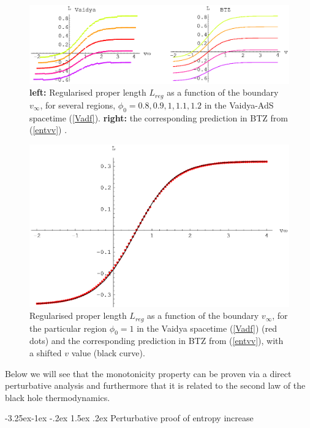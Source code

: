 \documentclass[12pt]{article}
\makeatletter
\renewcommand\subsection{\@startsection{subsection}{2}{\z@}%
                                     {-3.25ex\@plus -1ex \@minus -.2ex}%
                                     {1.5ex \@plus .2ex}%
                                     {\normalfont\bfseries}}
\def\pho{\phi_0}
\makeatother
\begin{document}
\begin{figure}[htbp]
\begin{center}
\includegraphics[width=6.5in]{Lvar_Vad}
\caption{{\bf left:} Regularised proper length $L_{reg}$ as a function of
the boundary $v_{\infty}$, for several regions,
$\pho=0.8,0.9,1,1.1,1.2$ in the Vaidya-AdS spacetime (\ref{Vadf}). {\bf
right:} the corresponding prediction in BTZ from (\ref{entvv}) . }
\label{LvarVad}
\end{center}
\end{figure}
%
\begin{figure}[htbp]
\begin{center}
\includegraphics[width=4.5in]{Lvar_fit_Vad}
\caption{ Regularised proper length $L_{reg}$ as a function of the
boundary $v_{\infty}$, for the particular region $\pho=1$ in the
Vaidya spacetime (\ref{Vadf}) (red dots) and the corresponding
prediction in BTZ from (\ref{entvv}), with a shifted $v$ value
(black curve). } \label{LvarfitVad}
\end{center}
\end{figure}
%

Below we will see that the monotonicity property can be proven via a
direct perturbative analysis and furthermore that it is related to
 the second law of the black hole thermodynamics.

\subsection{Perturbative proof of entropy increase}
\end{document}
